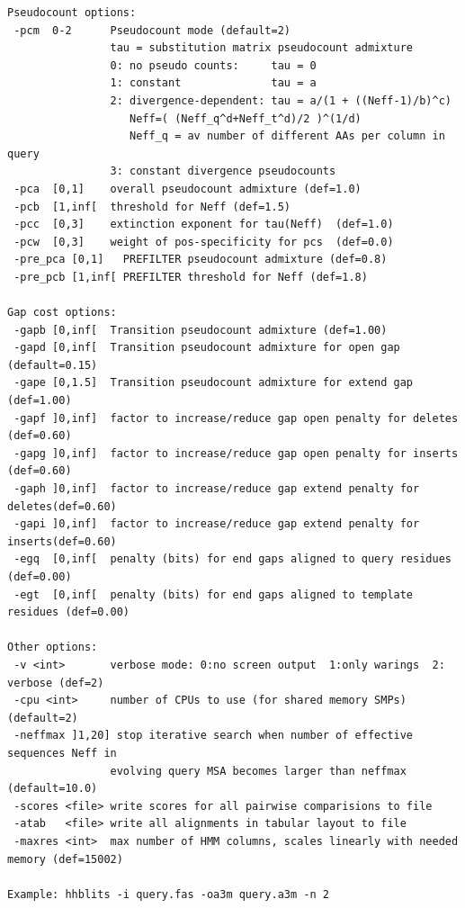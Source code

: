 \documentclass[11pt,a4paper]{article}
\begin{document}
\begin{verbatim}
Pseudocount options:                                                             
 -pcm  0-2      Pseudocount mode (default=2)                                   
                tau = substitution matrix pseudocount admixture                  
                0: no pseudo counts:     tau = 0                                 
                1: constant              tau = a                                 
                2: divergence-dependent: tau = a/(1 + ((Neff-1)/b)^c)            
                   Neff=( (Neff_q^d+Neff_t^d)/2 )^(1/d)                          
                   Neff_q = av number of different AAs per column in query       
                3: constant divergence pseudocounts                              
 -pca  [0,1]    overall pseudocount admixture (def=1.0)                        
 -pcb  [1,inf[  threshold for Neff (def=1.5)                                   
 -pcc  [0,3]    extinction exponent for tau(Neff)  (def=1.0)                   
 -pcw  [0,3]    weight of pos-specificity for pcs  (def=0.0)                   
 -pre_pca [0,1]   PREFILTER pseudocount admixture (def=0.8)                    
 -pre_pcb [1,inf[ PREFILTER threshold for Neff (def=1.8)                       

Gap cost options:                                                                
 -gapb [0,inf[  Transition pseudocount admixture (def=1.00)                     
 -gapd [0,inf[  Transition pseudocount admixture for open gap (default=0.15)    
 -gape [0,1.5]  Transition pseudocount admixture for extend gap (def=1.00)      
 -gapf ]0,inf]  factor to increase/reduce gap open penalty for deletes (def=0.60) 
 -gapg ]0,inf]  factor to increase/reduce gap open penalty for inserts (def=0.60) 
 -gaph ]0,inf]  factor to increase/reduce gap extend penalty for deletes(def=0.60)
 -gapi ]0,inf]  factor to increase/reduce gap extend penalty for inserts(def=0.60)
 -egq  [0,inf[  penalty (bits) for end gaps aligned to query residues (def=0.00) 
 -egt  [0,inf[  penalty (bits) for end gaps aligned to template residues (def=0.00)

Other options:                                                                   
 -v <int>       verbose mode: 0:no screen output  1:only warings  2: verbose (def=2)
 -cpu <int>     number of CPUs to use (for shared memory SMPs) (default=2)      
 -neffmax ]1,20] stop iterative search when number of effective sequences Neff in 
                evolving query MSA becomes larger than neffmax (default=10.0) 
 -scores <file> write scores for all pairwise comparisions to file               
 -atab   <file> write all alignments in tabular layout to file                   
 -maxres <int>  max number of HMM columns, scales linearly with needed memory (def=15002)

Example: hhblits -i query.fas -oa3m query.a3m -n 2   
\end{verbatim} 
\normalsize
\end{document}
